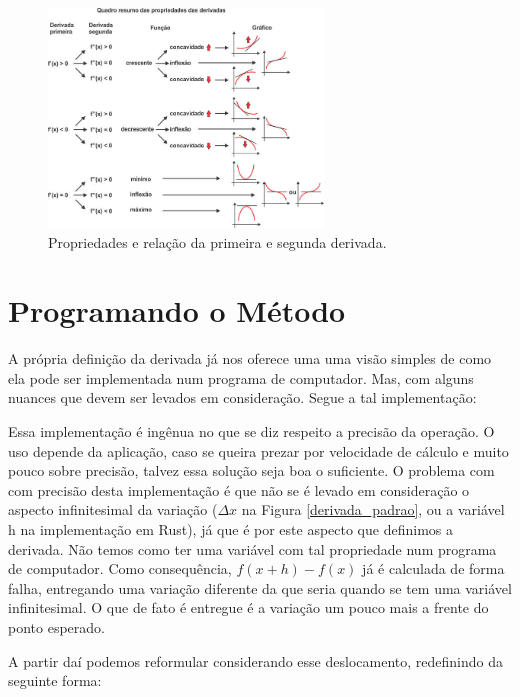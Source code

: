 \begin{figure}[h]
    \includegraphics[width=0.65\textwidth]
        {src/relacao_primeira_segunda_derivada.jpg}
    \centering
    \caption{Propriedades e relação da primeira e segunda derivada.}
    \label{relacao_primeira_segunda_derivada}
\end{figure}


\section{{Programando o Método}}

\hspace{0.8cm}


A própria definição da derivada já nos oferece uma uma visão simples de como
ela pode ser implementada num programa de computador. Mas, com alguns nuances
que devem ser levados em consideração. Segue a tal implementação:



Essa implementação é ingênua no que se diz respeito a precisão da operação. O
uso depende da aplicação, caso se queira prezar por velocidade de cálculo e
muito pouco sobre precisão, talvez essa solução seja boa o suficiente. O
problema com com precisão desta implementação é que não se é levado em
consideração o aspecto infinitesimal da variação (\(\Delta x\) na Figura \ref{derivada_padrao}, ou a variável h na implementação em Rust), já que é por
este aspecto que definimos a derivada. Não temos como ter uma variável com tal
propriedade num programa de computador. Como consequência, \(f(x + h) - f(x)\)
já é calculada de forma falha, entregando uma variação diferente da que seria
quando se tem uma variável infinitesimal. O que de fato é entregue é a variação
um pouco mais a frente do ponto esperado.

A partir daí podemos reformular considerando esse deslocamento, redefinindo
da seguinte forma:


